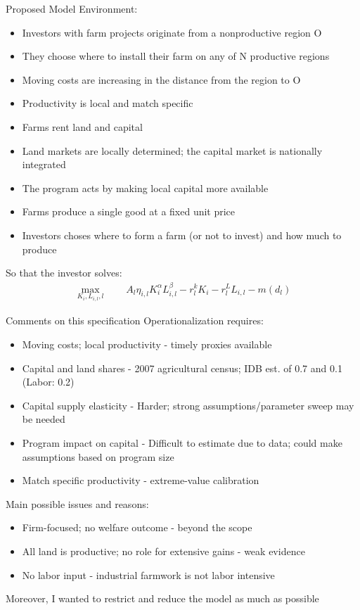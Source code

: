 \documentclass[aspectratio=169]{beamer}
\begin{document}
\begin{frame}{Proposed Model}
Environment:
\begin{itemize}
  \item Investors with farm projects originate from a nonproductive region O
  \item They choose where to install their farm on any of N productive regions
  \item Moving costs are increasing in the distance from the region to O 
  \item Productivity is local and match specific
  \item Farms rent land and capital
  \item Land markets are locally determined; the capital market is nationally integrated  
  \item The program acts by making local capital more available
  \item Farms produce a single good at a fixed unit price
  \item Investors choses where to form a farm (or not to invest) and how much to produce
\end{itemize}
\vspace{1em}

So that the investor solves:
\begin{align}
\max_{K_i, L_{i,l}, l} \qquad A_l\eta_{i, l}K_i^\alpha L_{i, l}^\beta - r_l^k K_i - r_l^L L_{i, l} - m(d_l)
\end{align}

\end{frame}

\begin{frame}{Comments on this specification}
Operationalization requires:
\begin{itemize}
  \item Moving costs; local productivity - timely proxies available
  \item Capital and land shares - 2007 agricultural census; IDB est. of 0.7 and 0.1 (Labor: 0.2)
  \item Capital supply elasticity - Harder; strong assumptions/parameter sweep may be needed
  \item Program impact on capital - Difficult to estimate due to data; could make assumptions based on program size
  \item Match specific productivity - extreme-value calibration
\end{itemize}
\vspace{1em}

Main possible issues and reasons:
\begin{itemize}
  \item Firm-focused; no welfare outcome - beyond the scope
  \item All land is productive; no role for extensive gains - weak evidence
  \item No labor input - industrial farmwork is not labor intensive
\end{itemize}
Moreover, I wanted to restrict and reduce the model as much as possible 
\end{frame}
\end{document}
